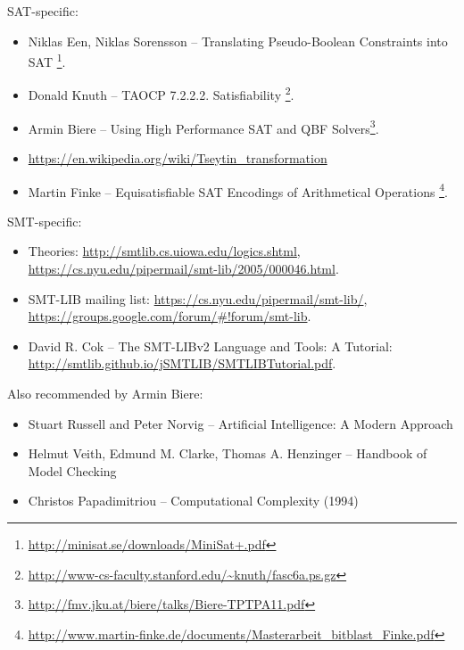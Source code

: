 SAT-specific:

\begin{itemize}

\item Niklas Een, Niklas Sorensson -- Translating Pseudo-Boolean Constraints into SAT
\footnote{\url{http://minisat.se/downloads/MiniSat+.pdf}}.

\item Donald Knuth -- \ac{TAOCP} 7.2.2.2. Satisfiability
\footnote{\url{http://www-cs-faculty.stanford.edu/~knuth/fasc6a.ps.gz}}.

\item Armin Biere -- Using High Performance SAT and QBF Solvers\footnote{\url{http://fmv.jku.at/biere/talks/Biere-TPTPA11.pdf}}.

\item \url{https://en.wikipedia.org/wiki/Tseytin_transformation}

\item Martin Finke -- Equisatisfiable SAT Encodings of Arithmetical Operations
\footnote{\url{http://www.martin-finke.de/documents/Masterarbeit_bitblast_Finke.pdf}}.

\end{itemize}

SMT-specific:

\begin{itemize}
\item Theories: \url{http://smtlib.cs.uiowa.edu/logics.shtml}, \url{https://cs.nyu.edu/pipermail/smt-lib/2005/000046.html}.

\item SMT-LIB mailing list: \url{https://cs.nyu.edu/pipermail/smt-lib/}, \url{https://groups.google.com/forum/#!forum/smt-lib}.

\item David R. Cok -- The SMT-LIBv2 Language and Tools: A Tutorial: \url{http://smtlib.github.io/jSMTLIB/SMTLIBTutorial.pdf}.

\end{itemize}

Also recommended by Armin Biere:

\begin{itemize}
\item Stuart Russell and Peter Norvig -- Artificial Intelligence: A Modern Approach

\item Helmut Veith, Edmund M. Clarke, Thomas A. Henzinger -- Handbook of Model Checking

\item Christos Papadimitriou -- Computational Complexity (1994)
\end{itemize}

